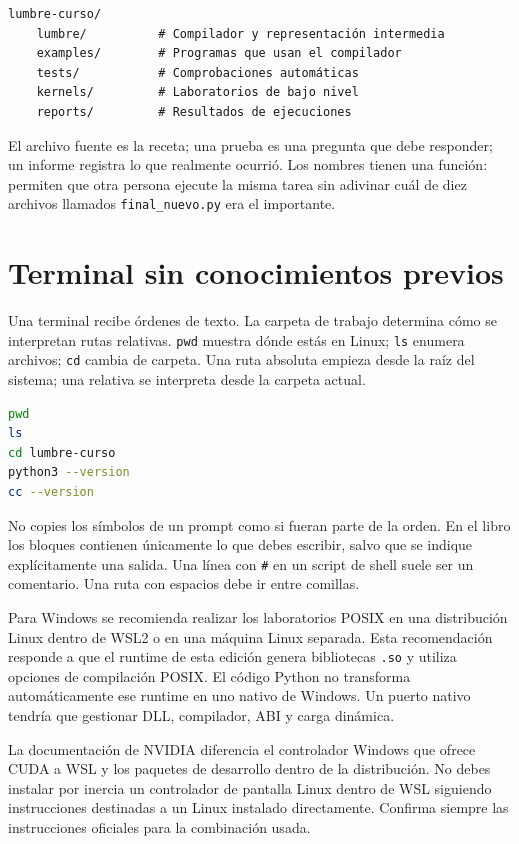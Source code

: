 \documentclass[12pt,a4paper,oneside]{report}
\begin{document}
\begin{lstlisting}
lumbre-curso/
    lumbre/          # Compilador y representación intermedia
    examples/        # Programas que usan el compilador
    tests/           # Comprobaciones automáticas
    kernels/         # Laboratorios de bajo nivel
    reports/         # Resultados de ejecuciones
\end{lstlisting}
El archivo fuente es la receta; una prueba es una pregunta que debe responder; un informe registra lo que realmente ocurrió. Los nombres tienen una función: permiten que otra persona ejecute la misma tarea sin adivinar cuál de diez archivos llamados \texttt{final\_nuevo.py} era el importante.

\section{Terminal sin conocimientos previos}
Una terminal recibe órdenes de texto. La carpeta de trabajo determina cómo se interpretan rutas relativas. \texttt{pwd} muestra dónde estás en Linux; \texttt{ls} enumera archivos; \texttt{cd} cambia de carpeta. Una ruta absoluta empieza desde la raíz del sistema; una relativa se interpreta desde la carpeta actual.

\begin{lstlisting}[language=bash]
pwd
ls
cd lumbre-curso
python3 --version
cc --version
\end{lstlisting}
No copies los símbolos de un prompt como si fueran parte de la orden. En el libro los bloques contienen únicamente lo que debes escribir, salvo que se indique explícitamente una salida. Una línea con \texttt{\#} en un script de shell suele ser un comentario. Una ruta con espacios debe ir entre comillas.

Para Windows se recomienda realizar los laboratorios POSIX en una distribución Linux dentro de WSL2 o en una máquina Linux separada. Esta recomendación responde a que el runtime de esta edición genera bibliotecas \texttt{.so} y utiliza opciones de compilación POSIX. El código Python no transforma automáticamente ese runtime en uno nativo de Windows. Un puerto nativo tendría que gestionar DLL, compilador, ABI y carga dinámica.

La documentación de NVIDIA diferencia el controlador Windows que ofrece CUDA a WSL y los paquetes de desarrollo dentro de la distribución. No debes instalar por inercia un controlador de pantalla Linux dentro de WSL siguiendo instrucciones destinadas a un Linux instalado directamente. Confirma siempre las instrucciones oficiales para la combinación usada. \cite{cuda-wsl}
\end{document}
